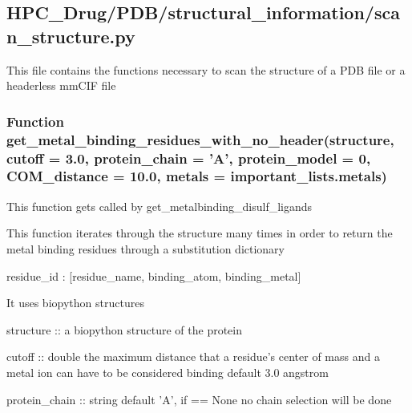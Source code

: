 

\subsection{HPC\_Drug/PDB/structural\_information/scan\_structure.py}

    This file contains the functions necessary to scan the structure of a PDB file or a headerless mmCIF file

    \subsubsection{Function get\_metal\_binding\_residues\_with\_no\_header(structure, cutoff = 3.0, protein\_chain = 'A', protein\_model = 0, COM\_distance = 10.0, metals = important\_lists.metals)}

        This function gets called by get\_metalbinding\_disulf\_ligands

        This function iterates through the structure many times in order to return the metal binding residues through a substitution dictionary

        {residue\_id : [residue\_name, binding\_atom, binding\_metal]}

        It uses biopython structures

        structure :: a biopython structure of the protein

        cutoff :: double the maximum distance that a residue's center of mass and a metal ion can have to be considered binding default 3.0 angstrom

        protein\_chain :: string default 'A', if == None no chain selection will be done

